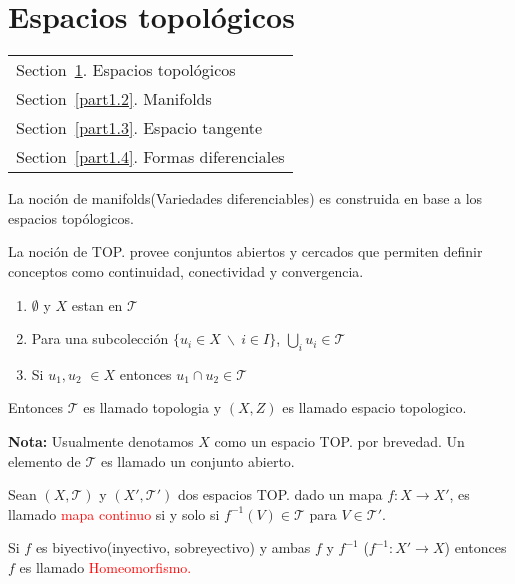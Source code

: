 \documentclass[../main]{subfiles}
\begin{document}
\section{Espacios topológicos}\label{part1.1}
        \begin{margintable}\vspace{.8in}\footnotesize
		\begin{tabularx}{\marginparwidth}{|X}
		Section~\ref{part1.1}. Espacios topológicos\\
            Section~\ref{part1.2}. Manifolds \\
            Section~\ref{part1.3}. Espacio tangente\\
            Section~\ref{part1.4}. Formas diferenciales\\
		\end{tabularx}
	\end{margintable}

La noción de manifolds(Variedades diferenciables) es construida en base a los espacios topólogicos.

La noción de TOP. provee conjuntos abiertos y cercados que permiten definir conceptos como continuidad, conectividad y convergencia.


\begin{enumerate}
    \item $\emptyset$ y $X$ estan en $\mathcal{T}$
    \item Para una subcolección $\{ u_i \in X \ \backslash \ i \in I\}$, $\bigcup_i u_i \in \mathcal{T}$
    \item Si $u_1, u_2$ $\in X$ entonces $u_1 \cap u_2 \in \mathcal{T}$
\end{enumerate}

Entonces $\mathcal{T}$ es llamado topologia y $(X, Z)$ es llamado espacio topologico.

\textbf{Nota:} Usualmente denotamos $X$ como un espacio TOP. por brevedad. Un elemento de $\mathcal{T}$ es llamado un conjunto abierto.

Sean $(X, \mathcal{T})$ y $(X', \mathcal{T}')$ dos espacios TOP. dado un mapa $f:X\rightarrow X'$, es llamado \textcolor{red}{mapa continuo} si y solo si $f^{-1}(V)\in \mathcal{T}$ para $V \in \mathcal{T}'$.

Si $f$ es biyectivo(inyectivo, sobreyectivo) y ambas $f$ y $f^{-1}$ ($f^{-1}: X'\rightarrow X$) entonces $f$ es llamado \textcolor{red}{Homeomorfismo.}
\end{document}
